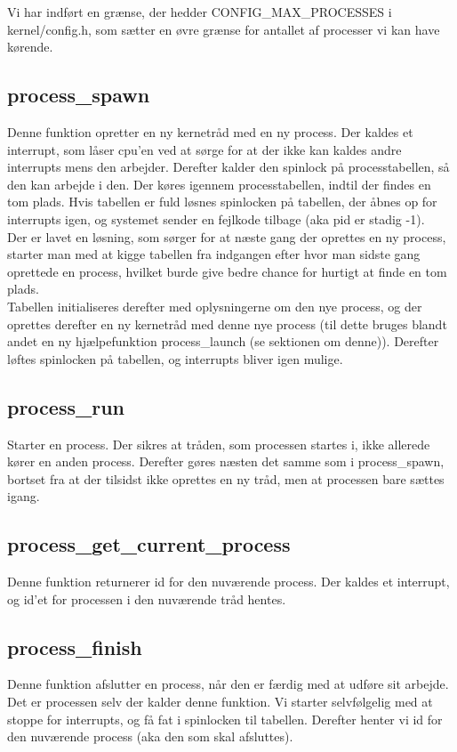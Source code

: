 \documentclass[10pt,a4paper,danish]{article}
\begin{document}
Vi har indført en grænse, der hedder CONFIG\_MAX\_PROCESSES i kernel/config.h, som sætter en øvre grænse for antallet af processer vi kan have kørende.

\subsection{process\_spawn}
Denne funktion opretter en ny kernetråd med en ny process. Der kaldes et interrupt, som låser cpu'en ved at sørge for at der ikke kan kaldes andre interrupts mens den arbejder. Derefter kalder den spinlock på processtabellen, så den kan arbejde i den. Der køres igennem processtabellen, indtil der findes en tom plads. Hvis tabellen er fuld løsnes spinlocken på tabellen, der åbnes op for interrupts igen, og systemet sender en fejlkode tilbage (aka pid er stadig -1).\\

Der er lavet en løsning, som sørger for at næste gang der oprettes en ny process, starter man med at kigge tabellen fra indgangen efter hvor man sidste gang oprettede en process, hvilket burde give bedre chance for hurtigt at finde en tom plads.\\

Tabellen initialiseres derefter med oplysningerne om den nye process, og der oprettes derefter en ny kernetråd med denne nye process (til dette bruges blandt andet en ny hjælpefunktion process\_launch (se sektionen om denne)). Derefter løftes spinlocken på tabellen, og interrupts bliver igen mulige. 

\subsection{process\_run}
Starter en process. Der sikres at tråden, som processen startes i, ikke allerede kører en anden process. Derefter gøres næsten det samme som i process\_spawn, bortset fra at der tilsidst ikke oprettes en ny tråd, men at processen bare sættes igang.

\subsection{process\_get\_current\_process}
Denne funktion returnerer id for den nuværende process. Der kaldes et interrupt, og id'et for processen i den nuværende tråd hentes.

\subsection{process\_finish}
Denne funktion afslutter en process, når den er færdig med at udføre sit arbejde. Det er processen selv der kalder denne funktion. Vi starter selvfølgelig med at stoppe for interrupts, og få fat i spinlocken til tabellen. Derefter henter vi id for den nuværende process (aka den som skal afsluttes).\\
\end{document}
